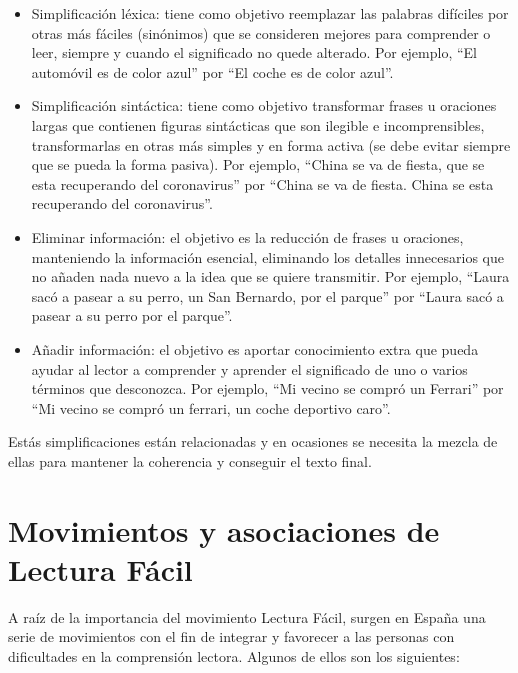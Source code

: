  \begin{itemize}
	
	\item Simplificación léxica: tiene como objetivo reemplazar las palabras difíciles por otras más fáciles (sinónimos) que se consideren mejores para comprender o leer, siempre y cuando el significado no quede alterado. Por ejemplo, ``El automóvil es de color azul'' por ``El coche es de color azul''.
	
	\item Simplificación sintáctica: tiene como objetivo transformar frases u oraciones largas que contienen figuras sintácticas que son ilegible e incomprensibles, transformarlas en otras más simples y en forma activa (se debe evitar siempre que se pueda la forma pasiva). Por ejemplo, ``China se va de fiesta, que se esta recuperando del coronavirus'' por ``China se va de fiesta. China se esta recuperando del coronavirus''. 
	
	\item Eliminar información: el objetivo es la reducción de frases u oraciones, manteniendo la información esencial, eliminando los detalles innecesarios que no añaden nada nuevo a la idea que se quiere transmitir. Por ejemplo, ``Laura sacó a pasear a su perro, un San Bernardo, por el parque'' por ``Laura sacó a pasear a su perro por el parque''. 
	
	\item Añadir información: el objetivo es aportar conocimiento extra que pueda ayudar al lector a comprender y aprender el significado de uno o varios términos que desconozca. Por ejemplo, ``Mi vecino se compró un Ferrari'' por ``Mi vecino se compró un ferrari, un coche deportivo caro''. 
	
\end{itemize}


 Estás simplificaciones están relacionadas y en ocasiones se necesita la mezcla de ellas para mantener la coherencia y conseguir el texto final.




\section{Movimientos y asociaciones de Lectura Fácil}

A raíz de la importancia del movimiento Lectura Fácil, surgen en España una serie de movimientos con el fin de integrar y favorecer a las personas con dificultades en la comprensión lectora. Algunos de ellos son los siguientes:



